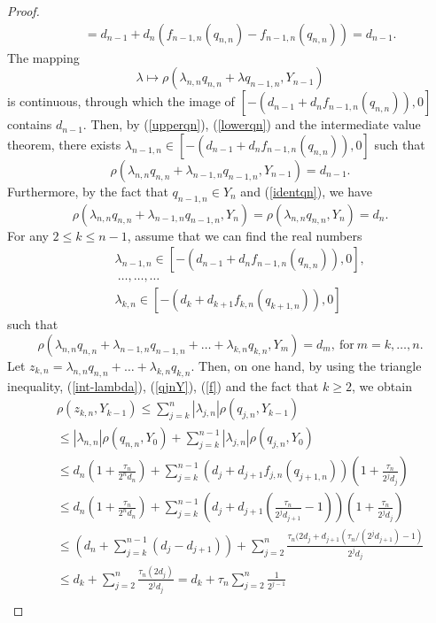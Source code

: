 \documentclass[12pt, reqno]{amsart}
\theoremstyle{definition}
\theoremstyle{remark}
\numberwithin{equation}{section}
\begin{document}
\begin{proof}
\begin{eqnarray}
&&=d_{n-1}+d_n\left(f_{n-1,n}(q_{n,n})-f_{n-1,n}(q_{n,n})\right)= d_{n-1}.
\end{eqnarray}
The mapping
$$
\lambda\longmapsto\rho(\lambda_{n,n}q_{n,n}+\lambda q_{n-1,n},Y_{n-1})
$$
 is continuous, through which the image of $[-(d_{n-1}+d_nf_{n-1,n}(q_{n,n})),0]$ contains $d_{n-1}$. Then,  by (\ref{upperqn}), (\ref{lowerqn}) and the intermediate value theorem, there exists $\lambda_{n-1,n}\in [-(d_{n-1}+d_nf_{n-1,n}(q_{n,n})),0]$ such that
\begin{equation}
\label{rhodn}
\rho(\lambda_{n,n}q_{n,n}+\lambda_{n-1,n}q_{n-1,n},Y_{n-1})= d_{n-1}.
\end{equation}
Furthermore, by the fact that $q_{n-1,n}\in Y_n$ and (\ref{identqn}), we have
$$
\rho(\lambda_{n,n}q_{n,n}+\lambda_{n-1,n}q_{n-1,n},Y_{n})= \rho(\lambda_{n,n}q_{n,n},Y_{n})= d_{n}.
$$
For any $2\le k\le n-1$, assume that we can find the real numbers
\begin{eqnarray}
\label{int-lambda}
&&\lambda_{n-1,n}\in[-(d_{n-1}+d_{n}f_{n-1,n}(q_{n,n})),0],\nonumber\\
&&~\ldots,\ldots,\ldots~\nonumber\\
&&\lambda_{k,n}\in[-(d_{k}+d_{k+1}f_{k,n}(q_{k+1,n})),0]
\end{eqnarray}
such that
$$
\rho(\lambda_{n,n}q_{n,n}+\lambda_{n-1,n}q_{n-1,n}+\ldots+\lambda_{k,n}q_{k,n},Y_m)=d_m,~\mbox{for}~m=k,\ldots,n.
$$
Let $
z_{k,n}=\lambda_{n,n}q_{n,n}+\ldots+\lambda_{k,n}q_{k,n}$.
Then, on one hand, by using the triangle inequality, (\ref{int-lambda}), (\ref{qjnY}), (\ref{f}) and  the fact that $k\ge2$, we obtain
\begin{eqnarray}
\label{zY}
&&\rho(z_{k,n},Y_{k-1})\le\sum_{j=k}^n|\lambda_{j,n}|\rho(q_{j,n},Y_{k-1})\nonumber\\
&&\le|\lambda_{n,n}|\rho(q_{n,n},Y_{0})+\sum_{j=k}^{n-1}|\lambda_{j,n}|\rho(q_{j,n},Y_{0})\nonumber\\
&&\le d_n\left(1+\frac{\tau_{n}}{2^nd_n}\right)+\sum_{j=k}^{n-1}\left(d_{j}+d_{j+1}f_{j,n}(q_{j+1,n})\right)\left(1+\frac{\tau_{n}}{2^jd_j}\right)\nonumber\\
&&\le d_n\left(1+\frac{\tau_{n}}{2^nd_n}\right)+\sum_{j=k}^{n-1}\left(d_{j}+d_{j+1}\left(\frac{\tau_n}{2^{j}d_{j+1}}-1\right)\right)\left(1+\frac{\tau_{n}}{2^jd_j}\right)\nonumber\\
&&\le \left(d_n+\sum_{j=k}^{n-1}(d_{j}-d_{j+1})\right)+\sum_{j=2}^{n}\frac{\tau_n(2d_j+d_{j+1}(\tau_n/(2^{j}d_{j+1})-1)}{2^jd_j}\nonumber\\
&&\le d_k+\sum_{j=2}^{n}\frac{\tau_n(2d_j)}{2^{j}d_j}= d_k+\tau_n\sum_{j=2}^n\frac{1}{2^{j-1}}\nonumber\\

\end{eqnarray}
\end{proof}
\end{document}
